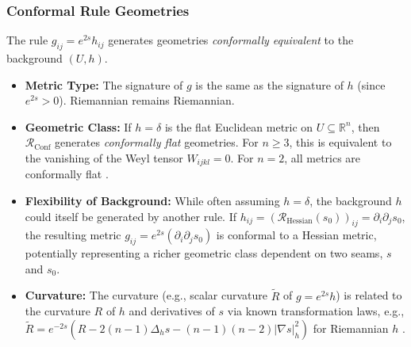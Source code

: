 \documentclass[twoside,twocolumn]{article}
\begin{document}
\subsubsection{Conformal Rule Geometries}
The rule \( g_{ij} = e^{2s} h_{ij} \) generates geometries \emph{conformally equivalent} to the background \( (U, h) \).
\begin{itemize}
    \item \textbf{Metric Type:} The signature of \( g \) is the same as the signature of \( h \) (since \( e^{2s}>0 \)). Riemannian remains Riemannian.
    \item \textbf{Geometric Class:} If \( h = \delta \) is the flat Euclidean metric on \( U \subseteq \mathbb{R}^n \), then \( \mathcal{R}_{\text{Conf}} \) generates \emph{conformally flat} geometries. For \( n \ge 3 \), this is equivalent to the vanishing of the Weyl tensor \( W_{ijkl}=0 \). For \( n=2 \), all metrics are conformally flat \cite{DiFrancesco2012}. %
    \item \textbf{Flexibility of Background:} While often assuming \( h=\delta \), the background \( h \) could itself be generated by another rule. If \( h_{ij} = (\mathcal{R}_{\text{Hessian}}(s_0))_{ij} = \partial_i \partial_j s_0 \), the resulting metric \( g_{ij} = e^{2s} (\partial_i \partial_j s_0) \) is conformal to a Hessian metric, potentially representing a richer geometric class dependent on two seams, \( s \) and \( s_0 \).
    \item \textbf{Curvature:} The curvature (e.g., scalar curvature \( \tilde{R} \) of \( g=e^{2s}h \)) is related to the curvature \( R \) of \( h \) and derivatives of \( s \) via known transformation laws, e.g., \( \tilde{R} = e^{-2s}(R - 2(n-1)\Delta_h s - (n-1)(n-2)|\nabla s|_h^2) \) for Riemannian \( h \) \cite{Besse1987}. %
\end{itemize}
\end{document}

